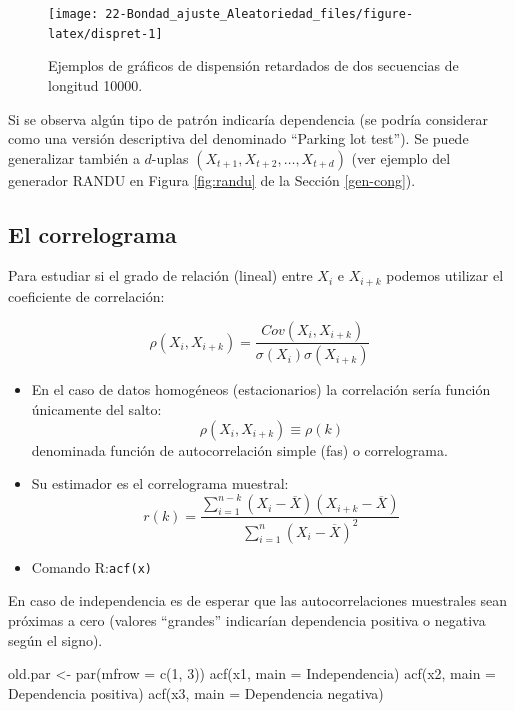 \documentclass[
]{book}
\newenvironment{Shaded}{\begin{snugshade}}{\end{snugshade}}
\newcommand{\AttributeTok}[1]{\textcolor[rgb]{0.77,0.63,0.00}{#1}}
\newcommand{\DecValTok}[1]{\textcolor[rgb]{0.00,0.00,0.81}{#1}}
\newcommand{\FunctionTok}[1]{\textcolor[rgb]{0.00,0.00,0.00}{#1}}
\newcommand{\NormalTok}[1]{#1}
\newcommand{\OtherTok}[1]{\textcolor[rgb]{0.56,0.35,0.01}{#1}}
\newcommand{\StringTok}[1]{\textcolor[rgb]{0.31,0.60,0.02}{#1}}
\theoremstyle{break}
\theoremstyle{nonumberplain}
\begin{document}
\begin{figure}[!htb]

{\centering \texttt{[image: 22-Bondad\_ajuste\_Aleatoriedad\_files/figure-latex/dispret-1]} 

}

\caption{Ejemplos de gráficos de dispensión retardados de dos secuencias de longitud 10000.}\label{fig:dispret}
\end{figure}

Si se observa algún tipo de patrón indicaría dependencia (se podría considerar como una versión descriptiva del denominado ``Parking lot test'').
Se puede generalizar también a \(d\)-uplas \((X_{t+1},X_{t+2},\ldots,X_{t+d})\)
(ver ejemplo del generador RANDU en Figura \ref{fig:randu} de la Sección \ref{gen-cong}).

\hypertarget{el-correlograma}{%
\subsection{El correlograma}\label{el-correlograma}}

Para estudiar si el grado de relación (lineal) entre \(X_{i}\) e
\(X_{i+k}\) podemos utilizar el coeficiente de correlación:

\[\rho\left(  X_{i},X_{i+k}\right) = \frac{Cov\left(  X_{i},X_{i+k}\right)    }
{\sigma\left(  X_{i}\right)  \sigma\left(  X_{i+k}\right)  }\]

\begin{itemize}
\item
  En el caso de datos homogéneos (estacionarios) la correlación sería función únicamente del salto:
  \[\rho\left(  X_{i},X_{i+k}\right)  \equiv\rho\left(  k\right)\]
  denominada función de autocorrelación simple (fas) o correlograma.
\item
  Su estimador es el correlograma muestral:
  \[r(k)=\frac{\sum_{i=1}^{n-k}(X_{i}-\overline{X})(X_{i+k}-\overline{X})}
  {\sum_{i=1}^{n}(X_{i}-\overline{X})^{2}}\]
\item
  Comando R:\texttt{acf(x)}
\end{itemize}

En caso de independencia es de esperar que las autocorrelaciones
muestrales sean próximas a cero (valores ``grandes'' indicarían
dependencia positiva o negativa según el signo).

\begin{Shaded}
\begin{Highlighting}[]
\NormalTok{old.par }\OtherTok{\textless{}{-}} \FunctionTok{par}\NormalTok{(}\AttributeTok{mfrow =} \FunctionTok{c}\NormalTok{(}\DecValTok{1}\NormalTok{, }\DecValTok{3}\NormalTok{))}
\FunctionTok{acf}\NormalTok{(x1, }\AttributeTok{main =} \StringTok{\textquotesingle{}Independencia\textquotesingle{}}\NormalTok{)}
\FunctionTok{acf}\NormalTok{(x2, }\AttributeTok{main =} \StringTok{\textquotesingle{}Dependencia positiva\textquotesingle{}}\NormalTok{)}
\FunctionTok{acf}\NormalTok{(x3, }\AttributeTok{main =} \StringTok{\textquotesingle{}Dependencia negativa\textquotesingle{}}\NormalTok{)}
\end{Highlighting}
\end{Shaded}
\end{document}
